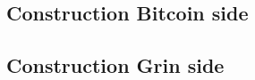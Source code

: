 \subsection{Construction Bitcoin side}\label{sec:atomicBtc}
\subsection{Construction Grin side}\label{sec:atomicGrin}